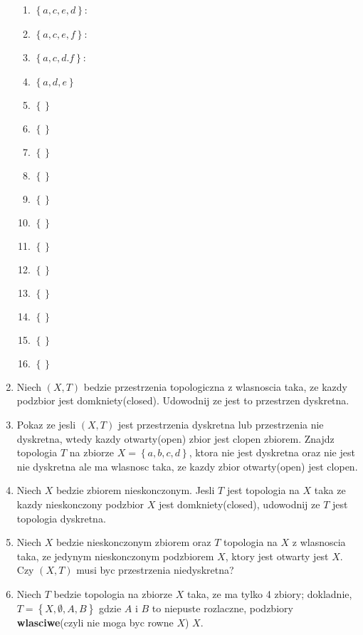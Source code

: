 \documentclass{article}
\begin{document}
\begin{enumerate}
\begin{enumerate}
\item $\left\{ a,c,e,d \right\}$:
\item $\left\{ a,c,e,f \right\}$:

\item $\left\{ a,c,d.f \right\}$:

\item $\left\{ a,d,e \right\}$
\item $\left\{  \right\}$
\item $\left\{  \right\}$
\item $\left\{  \right\}$
\item $\left\{  \right\}$
\item $\left\{  \right\}$
\item $\left\{  \right\}$
\item $\left\{  \right\}$
\item $\left\{  \right\}$
\item $\left\{  \right\}$
\item $\left\{  \right\}$
\item $\left\{  \right\}$
\item $\left\{  \right\}$


\end{enumerate} %
\item Niech $(X,T)$ bedzie przestrzenia topologiczna z wlasnoscia taka, ze kazdy podzbior jest domkniety(closed). Udowodnij ze jest to przestrzen dyskretna.
\item Pokaz ze jesli $(X,T)$ jest przestrzenia dyskretna lub przestrzenia nie dyskretna, wtedy kazdy otwarty(open) zbior jest clopen zbiorem. Znajdz topologia $T$ na zbiorze $X = \left\{ a,b,c,d \right\}$, ktora nie jest dyskretna oraz nie jest nie dyskretna ale ma wlasnosc taka, ze kazdy zbior otwarty(open) jest clopen.
\item Niech $X$ bedzie zbiorem nieskonczonym. Jesli $T$ jest topologia na $X$ taka ze kazdy nieskonczony podzbior $X$ jest domkniety(closed), udowodnij ze $T$ jest topologia dyskretna.
\item Niech $X$ bedzie nieskonczonym zbiorem oraz $T$ topologia na $X$ z wlasnoscia taka, ze jedynym nieskonczonym podzbiorem $X$, ktory jest otwarty jest $X$. Czy $(X, T)$ musi byc przestrzenia niedyskretna?
\item Niech $T$ bedzie topologia na zbiorze $X$ taka, ze ma tylko 4 zbiory; dokladnie, $T = \left\{ X, \emptyset, A, B \right\}$ gdzie $A$ i $B$ to niepuste rozlaczne, podzbiory \textbf{wlasciwe}(czyli nie moga byc rowne $X$) $X$.


\end{enumerate}
\end{document}
